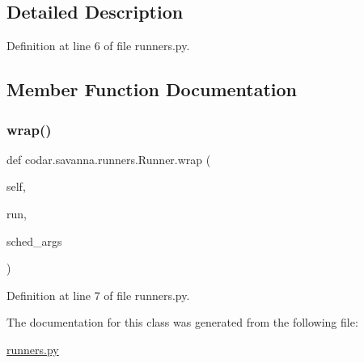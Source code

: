 \subsection{Detailed Description}


Definition at line 6 of file runners.\+py.



\subsection{Member Function Documentation}
\mbox{\label{classcodar_1_1savanna_1_1runners_1_1_runner_a7e8a83cd991c604a5238af27bdc6e013}} 
\subsubsection{\texorpdfstring{wrap()}{wrap()}}
{\footnotesize\ttfamily def codar.\+savanna.\+runners.\+Runner.\+wrap (\begin{DoxyParamCaption}\item[{}]{self,  }\item[{}]{run,  }\item[{}]{sched\+\_\+args }\end{DoxyParamCaption})}



Definition at line 7 of file runners.\+py.



The documentation for this class was generated from the following file\+:\begin{DoxyCompactItemize}
\item 
\hyperlink{runners_8py}{runners.\+py}\end{DoxyCompactItemize}
